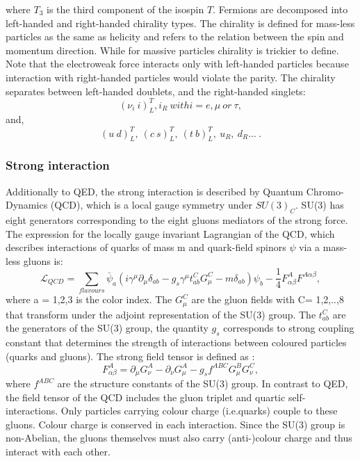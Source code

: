 where $T_3$ is the third component of the isospin $T$.
Fermions are decomposed into left-handed and right-handed chirality types. The chirality is defined for mass-less particles as the same as helicity and refers to the relation between the spin and momentum direction. While for massive particles chirality is trickier to define. Note that the electroweak force interacts only with left-handed particles because interaction with right-handed particles would violate the parity. The chirality separates between left-handed doublets, and the right-handed singlets:
\begin{equation}
    (\nu_i \ i)^T_L, i_R \ with i = e, \mu \ or \ \tau,
\end{equation}
and, 
\begin{equation}
    (u \ d)^T_L, \ (c \ s)^T_L, \ (t \ b)^T_L, \ u_R, \ d_R ... \ . 
\end{equation}

\subsubsection{Strong interaction}
Additionally to QED, the strong interaction is described by Quantum Chromo-Dynamics (QCD), which is a local gauge symmetry under $SU(3)_C$. SU(3) has eight generators corresponding to the eight gluons mediators of the strong force. The expression for the locally gauge invariant Lagrangian of the QCD, which describes interactions of quarks of mass m and quark-field spinors $\psi$ via a mass-less gluons is:
\begin{equation}
    \mathcal{L}_{QCD} = \sum_{flavours} \bar{\psi}_a(i\gamma^\mu\partial_\mu\delta_{ab}-g_{s}\gamma^\mu t^C_{ab}G^C_\mu - m\delta_{ab})\psi_b - \frac{1}{4}F^A_{\alpha\beta}F^{A\alpha\beta},
\end{equation}
where a = 1,2,3 is the color index. The $G^{C}_\mu$ are the gluon fields with C= 1,2,..,8 that transform under the adjoint representation of the SU(3) group.  The $t^C_{ab}$ are the generators of the SU(3) group, the quantity $g_{s}$ corresponds to strong coupling constant that determines the strength of interactions between coloured particles (quarks and gluons). The strong field tensor is defined as :
\begin{equation}
    F^A_{\alpha\beta} = \partial_\mu G^A_\nu - \partial_\nu G^A_\mu - g_sf^{ABC}G^B_\mu G^C_\nu,
\end{equation}
where $f^{ABC}$ are the structure constants of the SU(3) group. In contrast to QED, the field tensor of the QCD includes the gluon triplet and quartic self-interactions. Only particles carrying colour charge (i.e.quarks) couple to these gluons. Colour charge is conserved in each interaction. Since the SU(3) group is non-Abelian, the gluons themselves must also carry (anti-)colour charge and thus interact with each other. \\

